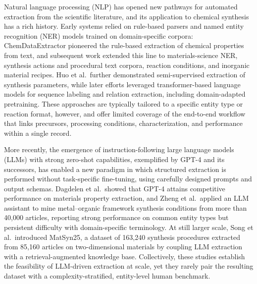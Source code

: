 \documentclass[12pt,a4paper]{article}
\begin{document}
Natural language processing (NLP) has opened new pathways for automated extraction from the scientific literature, and its application to chemical synthesis has a rich history. Early systems relied on rule-based parsers and named entity recognition (NER) models trained on domain-specific corpora: ChemDataExtractor pioneered the rule-based extraction of chemical properties from text,\cite{swain2016chemdataextractor} and subsequent work extended this line to materials-science NER,\cite{kim2017materials} synthesis actions and procedural text corpora,\cite{mysore2019materials} reaction conditions,\cite{vaucher2020automated} and inorganic material recipes.\cite{kononova2019text} Huo et al.\ further demonstrated semi-supervised extraction of synthesis parameters,\cite{huo2019semi} while later efforts leveraged transformer-based language models for sequence labeling and relation extraction, including domain-adapted pretraining.\cite{trewartha2022quantifying,gupta2022matscibert} These approaches are typically tailored to a specific entity type or reaction format, however, and offer limited coverage of the end-to-end workflow that links precursors, processing conditions, characterization, and performance within a single record.

More recently, the emergence of instruction-following large language models (LLMs) with strong zero-shot capabilities, exemplified by GPT-4 and its successors, has enabled a new paradigm in which structured extraction is performed without task-specific fine-tuning, using carefully designed prompts and output schemas. Dagdelen et al.\ showed that GPT-4 attains competitive performance on materials property extraction,\cite{dagdelen2024structured} and Zheng et al.\ applied an LLM assistant to mine metal--organic framework synthesis conditions from more than 40,000 articles, reporting strong performance on common entity types but persistent difficulty with domain-specific terminology.\cite{zheng2023chatgpt} At still larger scale, Song et al.\ introduced MatSyn25, a dataset of 163{,}240 synthesis procedures extracted from 85{,}160 articles on two-dimensional materials by coupling LLM extraction with a retrieval-augmented knowledge base.\cite{song2023matsyn25} Collectively, these studies establish the feasibility of LLM-driven extraction at scale, yet they rarely pair the resulting dataset with a complexity-stratified, entity-level human benchmark.
\end{document}
